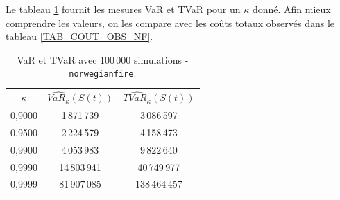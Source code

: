 		Le tableau \ref{TAB_TVAR_NF} fournit les mesures VaR et TVaR pour un $\kappa$ donné. Afin mieux comprendre les valeurs, on les compare avec les coûts totaux observés dans le tableau \ref{TAB_COUT_OBS_NF}.
		
		\begin{table}[H]
			\begin{center}
				\begin{tabular}{|c|c|c|}
					\hline
					$\kappa$ & $\widehat{VaR_{\kappa}}(S(t))$ & $\widehat{TVaR_{\kappa}}(S(t))$ \\ \hline
					0,9000   &         1\,871\,739         &         3\,086\,597          \\
					0,9500   &         2\,224\,579         &         4\,158\,473          \\
					0,9900   &         4\,053\,983         &         9\,822\,640          \\
					0,9990   &        14\,803\,941         &         40\,749\,977         \\
					0,9999   &        81\,907\,085         &        138\,464\,457         \\ \hline
				\end{tabular}
				\renewcommand{\tablename}{Tableau}
				\caption{VaR et TVaR avec 100\,000 simulations - \texttt{norwegianfire}.}\label{TAB_TVAR_NF}
			\end{center}
		\end{table}
		
